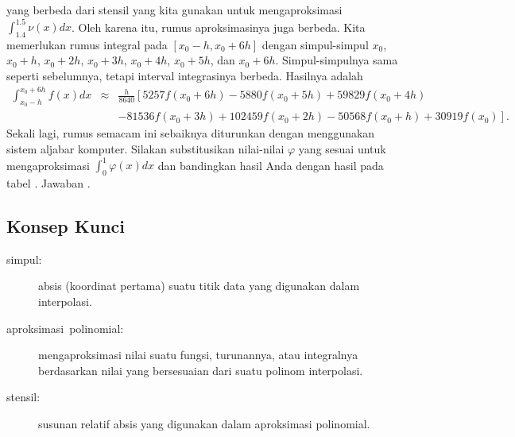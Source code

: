 \noindent yang berbeda dari stensil yang kita gunakan untuk mengaproksimasi
$\int_{1.4}^{1.5}\nu(x)dx$. Oleh karena itu, rumus aproksimasinya
juga berbeda. Kita memerlukan rumus integral pada $[x_{0}-h,x_{0}+6h]$
dengan simpul-simpul $x_{0}$, $x_{0}+h$, $x_{0}+2h$, $x_{0}+3h$,
$x_{0}+4h$, $x_{0}+5h$, dan $x_{0}+6h$. Simpul-simpulnya sama seperti
sebelumnya, tetapi interval integrasinya berbeda. Hasilnya adalah
\begin{eqnarray}
\int_{x_{0}-h}^{x_{0}+6h}f(x)dx & \approx & \frac{h}{8640}\left[5257f(x_{0}+6h)-5880f(x_{0}+5h)+59829f(x_{0}+4h)\right.\nonumber \\
 &  & \left.-81536f(x_{0}+3h)+102459f(x_{0}+2h)-50568f(x_{0}+h)+30919f(x_{0})\right].\label{eq:integral7dumb}
\end{eqnarray}
Sekali lagi, rumus semacam ini sebaiknya diturunkan dengan menggunakan
sistem aljabar komputer. Silakan substitusikan nilai-nilai $\varphi$
yang sesuai untuk mengaproksimasi $\int_{0}^{1}\varphi(x)dx$ dan
bandingkan hasil Anda dengan hasil pada tabel .
Jawaban .

\subsection{Konsep Kunci}
\begin{description}
\item [{simpul:}] absis (koordinat pertama) suatu titik
data yang digunakan dalam interpolasi.
\item [{aproksimasi~polinomial:}] mengaproksimasi
nilai suatu fungsi, turunannya, atau integralnya berdasarkan nilai
yang bersesuaian dari suatu polinom interpolasi.
\item [{stensil:}] susunan relatif absis yang digunakan
dalam aproksimasi polinomial.
\end{description}
\noindent\startexercises 


